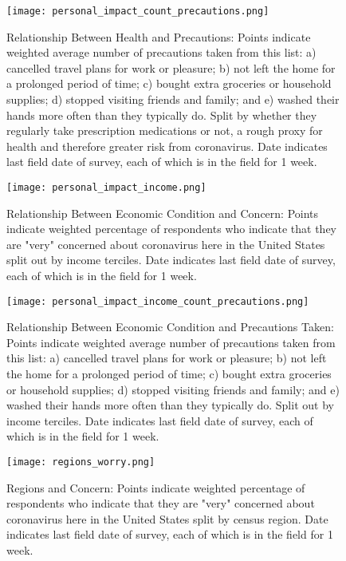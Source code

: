 \documentclass[landscape]{article}
\begin{document}
\begin{figure}
\begin{center}
\texttt{[image: personal\_impact\_count\_precautions.png]}
\end{center}
\caption{Relationship Between Health and Precautions: Points indicate weighted average number of precautions taken from this list: a) cancelled travel plans for work or pleasure; b) not left the home for a prolonged period of time; c) bought extra groceries or household supplies; d) stopped visiting friends and family; and e) washed their hands more often than they typically do. Split by whether they regularly take prescription medications or not, a rough proxy for health and therefore greater risk from coronavirus. Date indicates last field date of survey, each of which is in the field for 1 week.}
\end{figure}


\begin{figure}
\begin{center}
\texttt{[image: personal\_impact\_income.png]}
\end{center}
\caption{Relationship Between Economic Condition and Concern: Points indicate weighted percentage of respondents who indicate that they are "very" concerned about coronavirus here in the United States split out by income terciles. Date indicates last field date of survey, each of which is in the field for 1 week.}
\end{figure}

\begin{figure}
\begin{center}
\texttt{[image: personal\_impact\_income\_count\_precautions.png]}
\end{center}
\caption{Relationship Between Economic Condition and Precautions Taken: Points indicate weighted average number of precautions taken from this list: a) cancelled travel plans for work or pleasure; b) not left the home for a prolonged period of time; c) bought extra groceries or household supplies; d) stopped visiting friends and family; and e) washed their hands more often than they typically do. Split out by income terciles. Date indicates last field date of survey, each of which is in the field for 1 week.}
\end{figure}

\begin{figure}
\begin{center}
\texttt{[image: regions\_worry.png]}
\end{center}
\caption{Regions and Concern: Points indicate weighted percentage of respondents who indicate that they are "very" concerned about coronavirus here in the United States split by census region. Date indicates last field date of survey, each of which is in the field for 1 week.}
\end{figure}
\end{document}
